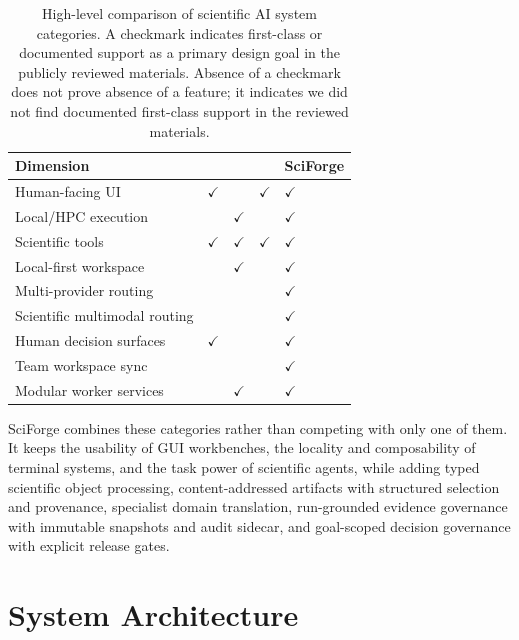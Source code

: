 \documentclass[sn-basic,Numbered,pdflatex]{sn-jnl}
\newcommand{\cmark}{\ensuremath{\checkmark}}
\begin{document}
\begin{table}[ht!]
\caption{High-level comparison of scientific AI system categories. A checkmark indicates first-class or documented support as a primary design goal in the publicly reviewed materials. Absence of a checkmark does not prove absence of a feature; it indicates we did not find documented first-class support in the reviewed materials.}
\label{tab:terminal_related_work}
\scriptsize
\centering
\setlength{\tabcolsep}{3pt}
\renewcommand{\arraystretch}{1.15}
\begin{tabular}{@{}L{4.4cm} C{1.7cm} C{1.9cm} C{1.7cm} C{1.5cm}@{}}
\toprule
\textbf{Dimension} &
\textbf{} &
\textbf{} &
\textbf{} &
\textbf{SciForge} \\
\midrule
Human-facing UI & \cmark &  & \cmark & \cmark \\
Local/HPC execution &  & \cmark &  & \cmark \\
Scientific tools & \cmark & \cmark & \cmark & \cmark \\
Local-first workspace &  & \cmark &  & \cmark \\
Multi-provider routing &  &  &  & \cmark \\
Scientific multimodal routing &  &  &  & \cmark \\
Human decision surfaces & \cmark &  &  & \cmark \\
Team workspace sync &  &  &  & \cmark \\
Modular worker services &  & \cmark &  & \cmark \\
\bottomrule
\end{tabular}
\end{table}

SciForge combines these categories rather than competing with only one of them. It keeps the usability of GUI workbenches, the locality and composability of terminal systems, and the task power of scientific agents, while adding typed scientific object processing, content-addressed artifacts with structured selection and provenance, specialist domain translation, run-grounded evidence governance with immutable snapshots and audit sidecar, and goal-scoped decision governance with explicit release gates.

\section{System Architecture}
\end{document}
